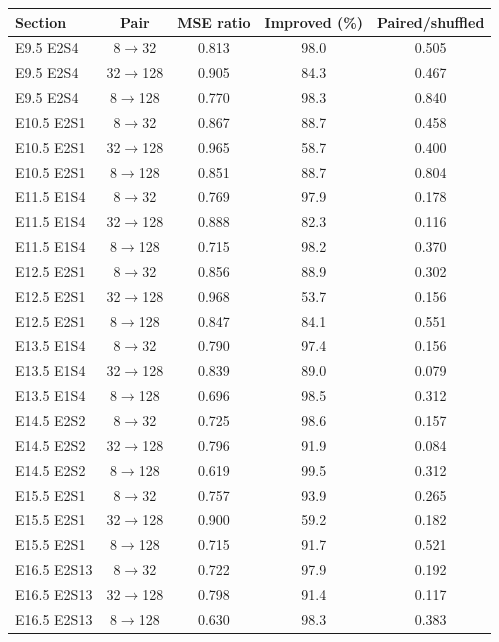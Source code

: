 \begin{tabular}{lcccc}
\toprule
Section & Pair & MSE ratio & Improved (\%) & Paired/shuffled \\
\midrule
E9.5 E2S4 & 8$\to$32 & 0.813 & 98.0 & 0.505 \\
E9.5 E2S4 & 32$\to$128 & 0.905 & 84.3 & 0.467 \\
E9.5 E2S4 & 8$\to$128 & 0.770 & 98.3 & 0.840 \\
E10.5 E2S1 & 8$\to$32 & 0.867 & 88.7 & 0.458 \\
E10.5 E2S1 & 32$\to$128 & 0.965 & 58.7 & 0.400 \\
E10.5 E2S1 & 8$\to$128 & 0.851 & 88.7 & 0.804 \\
E11.5 E1S4 & 8$\to$32 & 0.769 & 97.9 & 0.178 \\
E11.5 E1S4 & 32$\to$128 & 0.888 & 82.3 & 0.116 \\
E11.5 E1S4 & 8$\to$128 & 0.715 & 98.2 & 0.370 \\
E12.5 E2S1 & 8$\to$32 & 0.856 & 88.9 & 0.302 \\
E12.5 E2S1 & 32$\to$128 & 0.968 & 53.7 & 0.156 \\
E12.5 E2S1 & 8$\to$128 & 0.847 & 84.1 & 0.551 \\
E13.5 E1S4 & 8$\to$32 & 0.790 & 97.4 & 0.156 \\
E13.5 E1S4 & 32$\to$128 & 0.839 & 89.0 & 0.079 \\
E13.5 E1S4 & 8$\to$128 & 0.696 & 98.5 & 0.312 \\
E14.5 E2S2 & 8$\to$32 & 0.725 & 98.6 & 0.157 \\
E14.5 E2S2 & 32$\to$128 & 0.796 & 91.9 & 0.084 \\
E14.5 E2S2 & 8$\to$128 & 0.619 & 99.5 & 0.312 \\
E15.5 E2S1 & 8$\to$32 & 0.757 & 93.9 & 0.265 \\
E15.5 E2S1 & 32$\to$128 & 0.900 & 59.2 & 0.182 \\
E15.5 E2S1 & 8$\to$128 & 0.715 & 91.7 & 0.521 \\
E16.5 E2S13 & 8$\to$32 & 0.722 & 97.9 & 0.192 \\
E16.5 E2S13 & 32$\to$128 & 0.798 & 91.4 & 0.117 \\
E16.5 E2S13 & 8$\to$128 & 0.630 & 98.3 & 0.383 \\
\bottomrule
\end{tabular}
